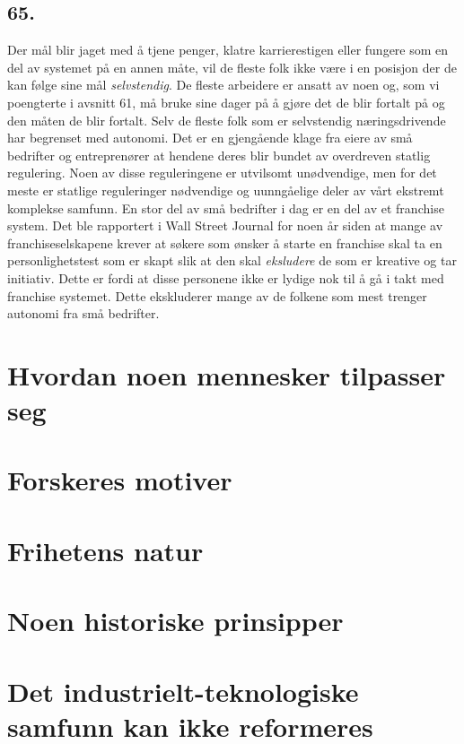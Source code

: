 \documentclass[oneside]{book}
\begin{document}
\section*{65.}
Der mål blir jaget med å tjene penger, klatre karrierestigen eller fungere som
en del av systemet på en annen måte, vil de fleste folk ikke være i en posisjon
der de kan følge sine mål \emph{selvstendig}. De fleste arbeidere er ansatt av
noen og, som vi poengterte i avsnitt 61, må bruke sine dager på å gjøre det de
blir fortalt på og den måten de blir fortalt. Selv de fleste folk som er
selvstendig næringsdrivende har begrenset med autonomi. Det er en gjengående
klage fra eiere av små bedrifter og entreprenører at hendene deres blir bundet
av overdreven statlig regulering. Noen av disse reguleringene er utvilsomt
unødvendige, men for det meste er statlige reguleringer nødvendige og
uunngåelige deler av vårt ekstremt komplekse samfunn. En stor del av små
bedrifter i dag er en del av et franchise system. Det ble rapportert i Wall
Street Journal for noen år siden at mange av franchiseselskapene krever at
søkere som ønsker å starte en franchise skal ta en personlighetstest som er
skapt slik at den skal \emph{eksludere} de som er kreative og tar initiativ.
Dette er fordi at disse personene ikke er lydige nok til å gå i takt med
franchise systemet. Dette ekskluderer mange av de folkene som mest trenger
autonomi fra små bedrifter.

\chapter{Hvordan noen mennesker tilpasser seg}

\chapter{Forskeres motiver}

\chapter{Frihetens natur}

\chapter{Noen historiske prinsipper}

\chapter{Det industrielt-teknologiske samfunn kan ikke reformeres}
\end{document}
